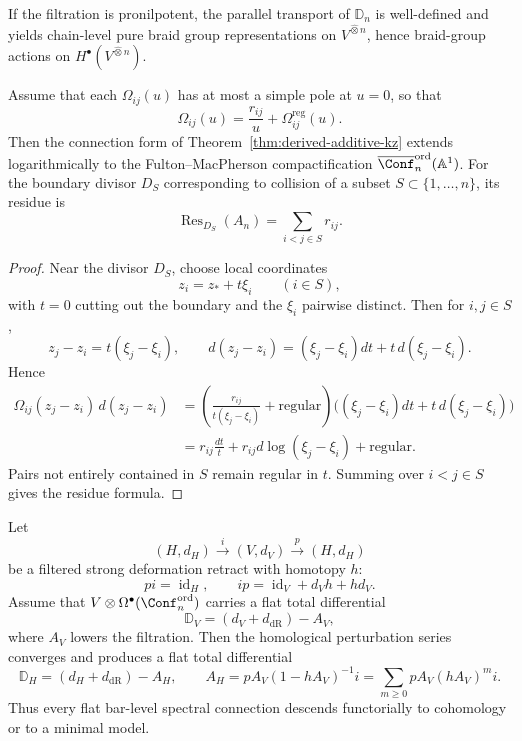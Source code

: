 \begin{corollary}
\ClaimStatusProvedHere
If the filtration is pronilpotent, the parallel transport of
$\mathbb D_n$ is well-defined and yields chain-level pure braid group
representations on $V^{\widehat\otimes n}$, hence braid-group actions
on $H^\bullet(V^{\widehat\otimes n})$.
\end{corollary}

\begin{theorem}
\ClaimStatusProvedHere
\label{thm:boundary-residue}
Assume that each $\Omega_{ij}(u)$ has at most a simple pole at $u=0$,
so that
\[
\Omega_{ij}(u)=\frac{r_{ij}}{u}+\Omega_{ij}^{\mathrm{reg}}(u).
\]
Then the connection form of Theorem~\ref{thm:derived-additive-kz}
extends logarithmically to the Fulton--MacPherson compactification
$\overline{\Conf}_n^{\mathrm{ord}}(\mathbb A^1)$.
For the boundary divisor $D_S$ corresponding to collision of a subset
$S\subset\{1,\dots,n\}$, its residue is
\[
\operatorname{Res}_{D_S}(A_n)=\sum_{i<j\in S} r_{ij}.
\]
\end{theorem}

\begin{proof}
Near the divisor $D_S$, choose local coordinates
\[
z_i=z_*+t\xi_i\qquad (i\in S),
\]
with $t=0$ cutting out the boundary and the $\xi_i$ pairwise distinct.
Then for $i,j\in S$,
\[
z_j-z_i=t(\xi_j-\xi_i),
\qquad
 d(z_j-z_i)=(\xi_j-\xi_i)dt+t\,d(\xi_j-\xi_i).
\]
Hence
\begin{align*}
\Omega_{ij}(z_j-z_i)\,d(z_j-z_i)
&=
\left(\frac{r_{ij}}{t(\xi_j-\xi_i)}+\text{regular}\right)
\big((\xi_j-\xi_i)dt+t\,d(\xi_j-\xi_i)\big)\\
&=r_{ij}\frac{dt}{t}+r_{ij}d\log(\xi_j-\xi_i)+\text{regular}.
\end{align*}
Pairs not entirely contained in $S$ remain regular in $t$.
Summing over $i<j\in S$ gives the residue formula.
\end{proof}

\begin{theorem}
\ClaimStatusProvedHere
\label{thm:transfer-flat-spectral}
Let
\[
(H,d_H)
\xrightarrow{i}
(V,d_V)
\xrightarrow{p}
(H,d_H)
\]
be a filtered strong deformation retract with homotopy $h$:
\[
pi=\operatorname{id}_H,
\qquad
ip=\operatorname{id}_V+d_Vh+hd_V.
\]
Assume that $V\otimes \Omega^\bullet(\Conf_n^{\mathrm{ord}})$ carries a
flat total differential
\[
\mathbb D_V=(d_V+d_{\mathrm{dR}})-A_V,
\]
where $A_V$ lowers the filtration. Then the homological perturbation
series converges and produces a flat total differential
\[
\mathbb D_H=(d_H+d_{\mathrm{dR}})-A_H,
\qquad
A_H=pA_V(1-hA_V)^{-1}i=
\sum_{m\ge 0} pA_V(hA_V)^mi.
\]
Thus every flat bar-level spectral connection descends functorially to
cohomology or to a minimal model.
\end{theorem}

